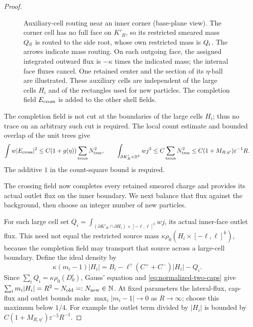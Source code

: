 \begin{proof}
\begin{figure}[tb]
\caption{Auxiliary-cell routing near an inner corner (base-plane view).
The corner cell has no full face on $K'_R$, so its restricted
smeared mass $Q_{\rm d}$ is routed to the side root, whose own restricted
mass is $Q_{\rm r}$. The arrows indicate mass routing. On each outgoing
face, the assigned integrated outward flux is $-\kappa$ times the indicated
mass; the internal face fluxes cancel.
One retained center and the section of its $\eta$-ball are illustrated.
These auxiliary cells are independent of the large cells $H_i$ and of
the rectangles used for new particles. The completion field
$E_{\rm cross}$ is added to the other shell fields.}
\label{fig:normalized-corner-routing}
\end{figure}

The completion field is not cut at the boundaries of the large cells
$H_i$; thus no trace on an arbitrary such cut is required.
The local count estimate and bounded overlap of the unit trees give
\[
 \int w|E_{\rm cross}|^2
       \le C(1+g(\eta))\sum_{\rm trees}N_{\rm tree}^2,
 \qquad
 \int_{\partial K'_R\times\mathbb R^k}w j^2
       \le C\sum_{\rm trees}N_{\rm tree}^2
       \le C(1+M_{R,\eta'})\varepsilon^{-1}R.
\]
The additive $1$ in the count-square bound is required.

The crossing field now completes every retained smeared charge and provides
its actual outlet flux on the inner boundary. We next balance that flux
against the background, then choose an integer number of new particles.

For each large cell set
$Q_i=\int_{(\partial K'_R\cap\partial H_i)\times[-\ell,\ell]^k}w j$,
its actual inner-face outlet flux.  This need not equal the restricted
source mass $\kappa\rho_0(H_i\times[-\ell,\ell]^k)$, because the
completion field may transport that source across a large-cell boundary.
Define the ideal density by
\begin{equation}
 \kappa(m_i-1)|H_i|
       =B_i-\ell^\gamma(C^++C^-)|H_i|-Q_i.
 \label{eq:normalized-shell-density}
\end{equation}
Since $\sum_iQ_i=\kappa\rho_0(D_0^c)$, Gauss' equation and
\eqref{eq:normalized-two-caps} give
$\sum_i m_i|H_i|=R^2-N_{\rm old}=:N_{\rm new}\in\mathbb N$.
At fixed parameters the lateral-flux, cap-flux and outlet bounds make
$\max_i|m_i-1|\to0$ as $R\to\infty$; choose this maximum below $1/4$.
For example the outlet term divided by $|H_i|$ is bounded by
$C(1+M_{R,\eta'})\varepsilon^{-5}R^{-1}$.


\end{proof}

